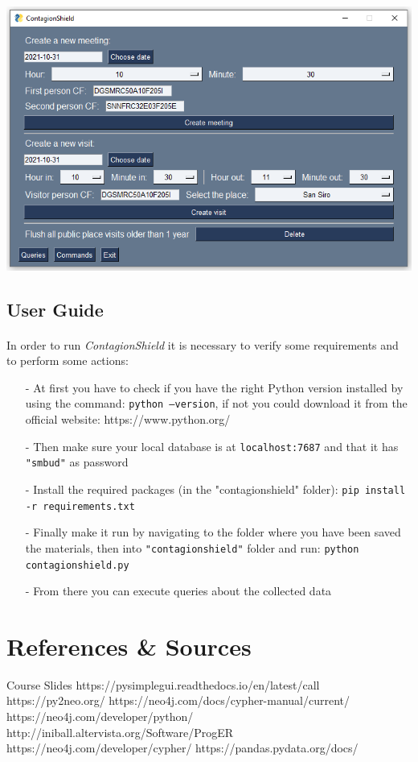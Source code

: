 \documentclass[a4paper,12pt]{article}
\begin{document}
	\begin{center}
 		\includegraphics[width = 11 cm]{commandpage.PNG}
	\end{center}
\subsection{User Guide}
\paragraph{}
In order to run \emph{ContagionShield} it is necessary to verify some requirements and to perform some actions:
\begin{itemize}[noitemsep]
   \item[-] At first you have to check if you have the right Python version installed by using the command: \texttt{python --version}, if not you could download it from the official website: https://www.python.org/ 
   \item[-] Then make sure your local database is at \texttt{localhost:7687} and that it has \texttt{"smbud"} as password
   \item[-] Install the required packages (in the "contagionshield" folder): \texttt{pip install -r requirements.txt}
   \item[-] Finally make it run by navigating to the folder where you have been saved the materials, then into \texttt{"contagionshield"} folder and run: \texttt{python contagionshield.py}
   \item[-] From there you can execute queries about the collected data
\end{itemize}
\newpage
\section{References \& Sources}
  \begin{thebibliography}{9}
    \bibitem{} Course Slides
    \bibitem{} https://pysimplegui.readthedocs.io/en/latest/call%
    \bibitem{} https://py2neo.org/
    \bibitem{} https://neo4j.com/docs/cypher-manual/current/
    \bibitem{} https://neo4j.com/developer/python/
    \bibitem{} http://iniball.altervista.org/Software/ProgER
    \bibitem{} https://neo4j.com/developer/cypher/
    \bibitem{} https://pandas.pydata.org/docs/
  \end{thebibliography}
\end{document}
